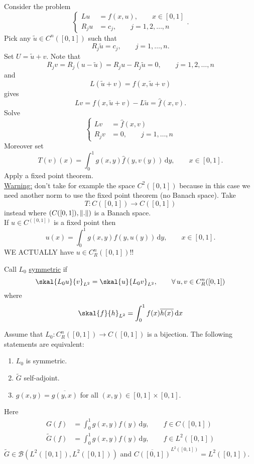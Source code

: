 \begin{bemerkung}
	Consider the problem
	\[
		\begin{cases}
			Lu &= f(x,u), \qquad x \in [0,1] \\
			R_ju &= c_j, \qquad j=1,2,\dots,n
		\end{cases}.
	\]
	Pick any $\tilde u \in C^n([0,1])$ such that
	\[
		R_j \tilde u = c_j, \qquad j=1, \dots,n.
	\]
	Set $U =  \tilde u + v$. Note that 
	\[
		R_jv= R_j(u- \tilde u) = R_ju - R_j \tilde u = 0, \qquad j =1,2,\dots,n
	\]
	and
	\[
		L( \tilde u + v) = f(x, \tilde u + v)
	\]
	gives \[
		Lv = f(x, \tilde u + v) - L \tilde u = \hat f(x,v).
	\] 
	Solve 
	\[
		\begin{cases}
			Lv &= \hat f (x,v) \\
			R_jv &=0, \qquad j=1, \dots,n
		\end{cases}
	\]
	Moreover set \[
		T(v)(x) = \int_{0}^{1}g(x,y) \hat f(y, v(y)) \,\mathrm{d}y, \qquad x \in [0,1].
	\]
	Apply a fixed point theorem. \\ \underline{Warning:} don't take for example the space $C^2([0,1])$ because in this case we need another norm to use the fixed point theorem (no Banach space). Take
	\[
		T : C([0,1]) \to  C([0,1])
	\] instead where $(C([0,1]), \norm{.})$ is a Banach space. \\
If $u \in C^([0,1])$ is a fixed point then
\[
	u(x) = \int_{0}^{1}g(x,y) f(y,u(y)) \,\mathrm{d}y, \qquad  x \in [0,1].
\]
WE ACTUALLY have $u \in C_R^n([0,1])$!!
\end{bemerkung}
\begin{definition*}
	Call $L_0$ \underline{symmetric} if 
	\[
		\skal{L_0u}{v}_{L^2} = \skal{u}{L_0v}_{L^2}, \qquad \forall\, u,v \in C_R^n([0,1])
	\]
	where
	\[
		\skal{f}{h}_{L^2} = \int_{0}^{1}f(x) \overline{h(x)} \,\mathrm{d}x
	\]
\end{definition*}
\begin{theorem}
	Assume that $L_0: C_R^n([0,1]) \to C([0,1])$ is a bijection. The following statements are equivalent:
	\begin{enumerate}
		\item $L_0$ is symmetric.
		\item $\tilde G$ self-adjoint. 
		\item $g(x,y) = \overline{g(y,x)}$ for all $(x,y) \in [0,1] \times [0,1]$.
	\end{enumerate}
	Here \begin{align*}
				G(f) &= \int_{0}^{1}g(x,y)f(y) \,\mathrm{d}y, \qquad  f \in C([0,1]) \\
				\tilde G(f) &= \int_{0}^{1}g(x,y)f(y) \,\mathrm{d}y, \qquad f \in L^2([0,1])
	\end{align*}
	$\tilde G \in \mathcal{B}(L^2([0,1]),L^2([0,1]))$ and $\overline{C([0,1])}^{L^2([0,1])} = L^2([0,1])$. \\
\end{theorem}

